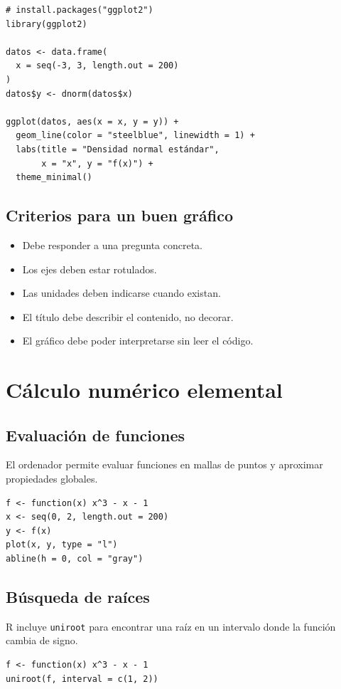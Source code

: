 \documentclass[11pt,a4paper,oneside]{book}
\begin{document}
\begin{lstlisting}[style=rstyle]
# install.packages("ggplot2")
library(ggplot2)

datos <- data.frame(
  x = seq(-3, 3, length.out = 200)
)
datos$y <- dnorm(datos$x)

ggplot(datos, aes(x = x, y = y)) +
  geom_line(color = "steelblue", linewidth = 1) +
  labs(title = "Densidad normal estándar",
       x = "x", y = "f(x)") +
  theme_minimal()
\end{lstlisting}

\section{Criterios para un buen gráfico}
\begin{itemize}
  \item Debe responder a una pregunta concreta.
  \item Los ejes deben estar rotulados.
  \item Las unidades deben indicarse cuando existan.
  \item El título debe describir el contenido, no decorar.
  \item El gráfico debe poder interpretarse sin leer el código.
\end{itemize}

\chapter{Cálculo numérico elemental}

\section{Evaluación de funciones}
El ordenador permite evaluar funciones en mallas de puntos y aproximar propiedades globales.

\begin{lstlisting}[style=rstyle]
f <- function(x) x^3 - x - 1
x <- seq(0, 2, length.out = 200)
y <- f(x)
plot(x, y, type = "l")
abline(h = 0, col = "gray")
\end{lstlisting}

\section{Búsqueda de raíces}
R incluye \texttt{uniroot} para encontrar una raíz en un intervalo donde la función cambia de signo.

\begin{lstlisting}[style=rstyle]
f <- function(x) x^3 - x - 1
uniroot(f, interval = c(1, 2))
\end{lstlisting}
\end{document}
